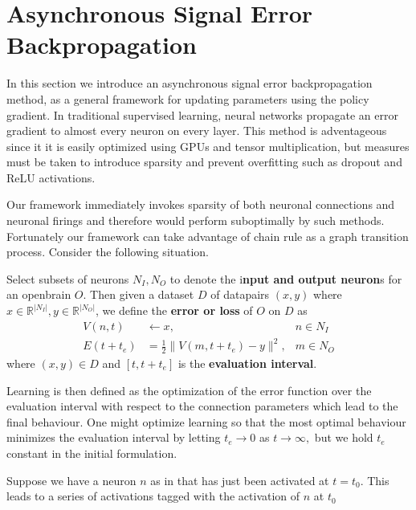 \section{Asynchronous Signal Error Backpropagation}

In this section we introduce an asynchronous signal error backpropagation method,
as a general framework for updating parameters using the policy gradient. In traditional
supervised learning, neural networks propagate an error gradient to almost every neuron on every layer.
This method is adventageous since it it is easily optimized using GPUs and tensor multiplication, but measures must be 
taken to introduce sparsity and prevent overfitting such as dropout and ReLU activations. 

Our framework immediately invokes sparsity of both neuronal connections and neuronal firings and therefore would perform suboptimally 
by such methods. Fortunately our framework can take advantage of chain rule as a graph transition process. Consider the following situation.

\begin{definition}
	Select subsets of neurons $N_I, N_O$ to denote the i\textbf{nput and output neuron}s for an openbrain $O.$ Then given a dataset $D$ of datapairs $(x,y)$ where $x \in \mathbb{R}^{|N_I|}, y \in \mathbb{R}^{|N_O|}$, we define the \textbf{error or loss} of $O$ on $D$ as 
	\begin{equation}
		\begin{aligned}
			V(n,t) &\leftarrow x, &n \in N_I \\
			E(t+t_e) &= \frac{1}{2} \|V(m,t+t_e) - y\|^2, &m \in N_O
		\end{aligned}
	\end{equation}
	where $(x,y) \in D$ and $[t,t+t_e]$ is the \textbf{evaluation interval}.
\end{definition}

Learning is then defined as the optimization of the error function over the evaluation interval with respect to the connection parameters which lead to the final behaviour. One might optimize learning so that the most optimal behaviour minimizes the evaluation interval by letting $t_e \to 0$ as $t \to \infty,$ but we hold $t_e$ constant in the initial formulation.


Suppose we have a neuron $n$ as in  that has just been activated at $t = t_0.$ This leads to a series of activations tagged with the activation of $n$ at $t_0$ 

